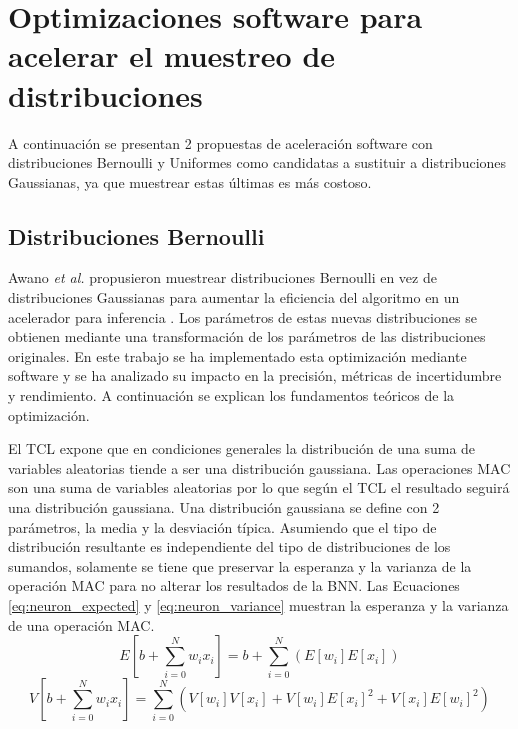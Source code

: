\chapter{Optimizaciones software para acelerar el muestreo de distribuciones} \label{ch:optimizaciones}

A continuación se presentan 2 propuestas de aceleración software con distribuciones Bernoulli y Uniformes como candidatas a sustituir a distribuciones Gaussianas, ya que muestrear estas últimas es más costoso.

\section{Distribuciones Bernoulli}

Awano \emph{et al.} propusieron muestrear distribuciones Bernoulli en vez de distribuciones Gaussianas para aumentar la eficiencia del algoritmo en un acelerador para inferencia \cite{bnn_clt_approx}. Los parámetros de estas nuevas distribuciones se obtienen mediante una transformación de los parámetros de las distribuciones originales. En este trabajo se ha implementado esta optimización mediante software y se ha analizado su impacto en la precisión, métricas de incertidumbre y rendimiento. A continuación se explican los fundamentos teóricos de la optimización.

El TCL expone que en condiciones generales la distribución de una suma de variables aleatorias tiende a ser una distribución gaussiana. Las operaciones MAC son una suma de variables aleatorias por lo que según el TCL el resultado seguirá una distribución gaussiana. Una distribución gaussiana se define con 2 parámetros, la media y la desviación típica. Asumiendo que el tipo de distribución resultante es independiente del tipo de distribuciones de los sumandos, solamente se tiene que preservar la esperanza y la varianza de la operación MAC para no alterar los resultados de la BNN. Las Ecuaciones \ref{eq:neuron_expected}  y \ref{eq:neuron_variance} muestran la esperanza y la varianza de una operación MAC.
\begin{equation} \label{eq:neuron_expected}
E\left[ b + \sum_{i=0}^N w_i x_i \right]  = b + \sum_{i=0}^N ( E[w_i] E[x_i] )
\end{equation}
\begin{equation} \label{eq:neuron_variance}
V\left[ b + \sum_{i=0}^N w_i x_i \right] = \sum_{i=0}^N ( V[w_i]V[x_i] + V[w_i]E[x_i]^2 + V[x_i]E[w_i]^2 )
\end{equation}

